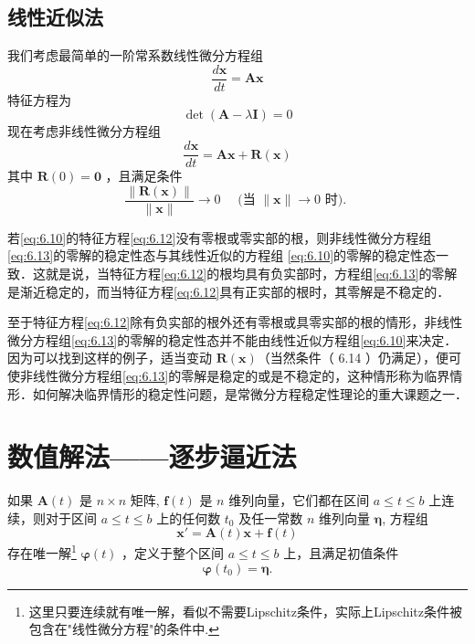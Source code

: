 \subsection{线性近似法}
我们考虑最简单的一阶常系数线性微分方程组
\begin{equation}\label{eq:6.10}
    \frac{d\mathbf{x}}{dt}=\boldsymbol{A}\mathbf{x}
\end{equation}
特征方程为
\begin{equation}\label{eq:6.12}
    \det(\boldsymbol{A}-\lambda\boldsymbol{I})=0
\end{equation}
现在考虑非线性微分方程组
\begin{equation}\label{eq:6.13}
    \frac{d\mathbf{x}}{dt}=\boldsymbol{A}\mathbf{x}+\boldsymbol{R}(\mathbf{x})
\end{equation}
其中 $\boldsymbol{R}(0)=\mathbf{0}$ ，且满足条件
$$
    \frac{\|\boldsymbol{R}(\boldsymbol{x})\|}{\|\boldsymbol{x}\|} \longrightarrow 0 \quad\text { (当 }\|\boldsymbol{x}\| \rightarrow 0 \text { 时). }
$$
\begin{theorem} 
    若\ref{eq:6.10}的特征方程\ref{eq:6.12}没有零根或零实部的根，则非线性微分方程组\ref{eq:6.13}的零解的稳定性态与其线性近似的方程组 \ref{eq:6.10}的零解的稳定性态一致．这就是说，当特征方程\ref{eq:6.12}的根均具有负实部时，方程组\ref{eq:6.13}的零解是渐近稳定的，而当特征方程\ref{eq:6.12}具有正实部的根时，其零解是不稳定的．
\end{theorem}
\begin{remark}
    至于特征方程\ref{eq:6.12}除有负实部的根外还有零根或具零实部的根的情形，非线性微分方程组\ref{eq:6.13}的零解的稳定性态并不能由线性近似方程组\ref{eq:6.10}来决定．因为可以找到这样的例子，适当变动 $\boldsymbol{R}(\boldsymbol{x})$（当然条件（ 6.14 ）仍满足），便可使非线性微分方程组\ref{eq:6.13}的零解是稳定的或是不稳定的，这种情形称为临界情形．如何解决临界情形的稳定性问题，是常微分方程稳定性理论的重大课题之一．
\end{remark}


\section{数值解法——逐步逼近法}

\begin{theorem}[存在唯一性定理]
    如果 $\boldsymbol{A}(t)$ 是 $n \times n$ 矩阵, $\boldsymbol{f}(t)$ 是 $n$ 维列向量，它们都在区间 $a \leqslant t \leqslant b$ 上连续，则对于区间 $a \leqslant t \leqslant b$ 上的任何数 $t_0$ 及任一常数 $n$ 维列向量 $\boldsymbol{\eta}$, 方程组
    \begin{equation}\label{eq:5.4}
        \boldsymbol{x}'=\boldsymbol{A}(t) \boldsymbol{x}+\boldsymbol{f}(t)
    \end{equation}
    存在唯一解\footnote{这里只要连续就有唯一解，看似不需要Lipschitz条件，实际上Lipschitz条件被包含在"线性微分方程"的条件中.} $\boldsymbol{\varphi}(t)$ ，定义于整个区间 $a \leqslant t \leqslant b$ 上，且满足初值条件
    $$
        \boldsymbol{\varphi}\left(t_0\right)=\boldsymbol{\eta} .
    $$
\end{theorem}

